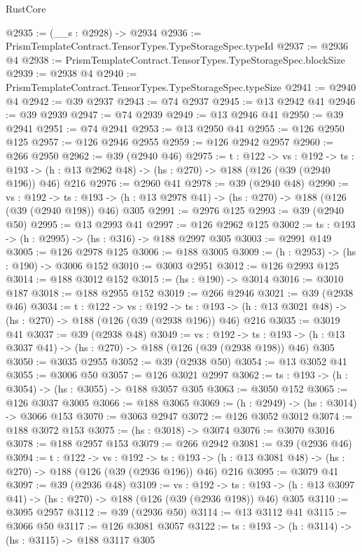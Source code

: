 \begin{lexlean}{RustCore}
\begin{coremodule}
@2935 := (__s : @2928) -> @2934
@2936 := PrismTemplateContract.TensorTypes.TypeStorageSpec.typeId
@2937 := @2936 @4
@2938 := PrismTemplateContract.TensorTypes.TypeStorageSpec.blockSize
@2939 := @2938 @4
@2940 := PrismTemplateContract.TensorTypes.TypeStorageSpec.typeSize
@2941 := @2940 @4
@2942 := @39 @2937
@2943 := @74 @2937
@2945 := @13 @2942 @41
@2946 := @39 @2939
@2947 := @74 @2939
@2949 := @13 @2946 @41
@2950 := @39 @2941
@2951 := @74 @2941
@2953 := @13 @2950 @41
@2955 := @126 @2950 @125
@2957 := @126 @2946 @2955
@2959 := @126 @2942 @2957
@2960 := @266 @2950
@2962 := @39 (@2940 @46)
@2975 := {t : @122} ->
  {vs : @192} ->
  {ts : @193} -> (h : @13 @2962 @48) -> (hs : @270) -> @188 (@126 (@39 (@2940 @196)) @46) @216
@2976 := @2960 @41
@2978 := @39 (@2940 @48)
@2990 := {vs : @192} ->
  {ts : @193} -> (h : @13 @2978 @41) -> (hs : @270) -> @188 (@126 (@39 (@2940 @198)) @46) @305
@2991 := @2976 @125
@2993 := @39 (@2940 @50)
@2995 := @13 @2993 @41
@2997 := @126 @2962 @125
@3002 := {ts : @193} -> (h : @2995) -> (hs : @316) -> @188 @2997 @305
@3003 := @2991 @149
@3005 := @126 @2978 @125
@3006 := @188 @3005
@3009 := (h : @2953) -> (hs : @190) -> @3006 @152
@3010 := @3003 @2951
@3012 := @126 @2993 @125
@3014 := @188 @3012 @152
@3015 := (hs : @190) -> @3014
@3016 := @3010 @187
@3018 := @188 @2955 @152
@3019 := @266 @2946
@3021 := @39 (@2938 @46)
@3034 := {t : @122} ->
  {vs : @192} ->
  {ts : @193} -> (h : @13 @3021 @48) -> (hs : @270) -> @188 (@126 (@39 (@2938 @196)) @46) @216
@3035 := @3019 @41
@3037 := @39 (@2938 @48)
@3049 := {vs : @192} ->
  {ts : @193} -> (h : @13 @3037 @41) -> (hs : @270) -> @188 (@126 (@39 (@2938 @198)) @46) @305
@3050 := @3035 @2955
@3052 := @39 (@2938 @50)
@3054 := @13 @3052 @41
@3055 := @3006 @50
@3057 := @126 @3021 @2997
@3062 := {ts : @193} -> (h : @3054) -> (hs : @3055) -> @188 @3057 @305
@3063 := @3050 @152
@3065 := @126 @3037 @3005
@3066 := @188 @3065
@3069 := (h : @2949) -> (hs : @3014) -> @3066 @153
@3070 := @3063 @2947
@3072 := @126 @3052 @3012
@3074 := @188 @3072 @153
@3075 := (hs : @3018) -> @3074
@3076 := @3070 @3016
@3078 := @188 @2957 @153
@3079 := @266 @2942
@3081 := @39 (@2936 @46)
@3094 := {t : @122} ->
  {vs : @192} ->
  {ts : @193} -> (h : @13 @3081 @48) -> (hs : @270) -> @188 (@126 (@39 (@2936 @196)) @46) @216
@3095 := @3079 @41
@3097 := @39 (@2936 @48)
@3109 := {vs : @192} ->
  {ts : @193} -> (h : @13 @3097 @41) -> (hs : @270) -> @188 (@126 (@39 (@2936 @198)) @46) @305
@3110 := @3095 @2957
@3112 := @39 (@2936 @50)
@3114 := @13 @3112 @41
@3115 := @3066 @50
@3117 := @126 @3081 @3057
@3122 := {ts : @193} -> (h : @3114) -> (hs : @3115) -> @188 @3117 @305

\end{coremodule}
\end{lexlean}
